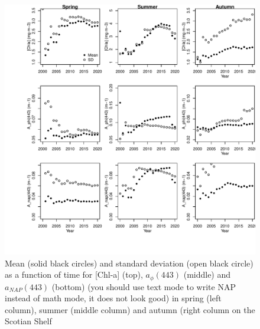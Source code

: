 \documentclass[utf8]{frontiersSCNS} %
\begin{document}
\begin{figure}[h!]
\begin{center}
\includegraphics[width=16cm]{fig10.pdf}
\end{center}
\caption{Mean (solid black circles) and standard deviation (open black circle) as a function of time for [Chl-a] (top), $a_\phi(443)$ (middle) and $a_{NAP}(443)$ (bottom) (you should use text mode to write NAP instead of math mode, it does not look good) in spring (left column), summer (middle column) and autumn (right column on the Scotian Shelf}\label{fig:10}
\end{figure}
\end{document}
